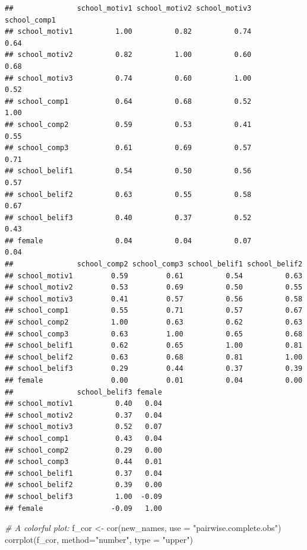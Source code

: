 \documentclass[
]{article}
\newenvironment{Shaded}{\begin{snugshade}}{\end{snugshade}}
\newcommand{\AttributeTok}[1]{\textcolor[rgb]{0.77,0.63,0.00}{#1}}
\newcommand{\CommentTok}[1]{\textcolor[rgb]{0.56,0.35,0.01}{\textit{#1}}}
\newcommand{\FunctionTok}[1]{\textcolor[rgb]{0.00,0.00,0.00}{#1}}
\newcommand{\NormalTok}[1]{#1}
\newcommand{\OtherTok}[1]{\textcolor[rgb]{0.56,0.35,0.01}{#1}}
\newcommand{\StringTok}[1]{\textcolor[rgb]{0.31,0.60,0.02}{#1}}
\begin{document}
\begin{verbatim}
##               school_motiv1 school_motiv2 school_motiv3 school_comp1
## school_motiv1          1.00          0.82          0.74         0.64
## school_motiv2          0.82          1.00          0.60         0.68
## school_motiv3          0.74          0.60          1.00         0.52
## school_comp1           0.64          0.68          0.52         1.00
## school_comp2           0.59          0.53          0.41         0.55
## school_comp3           0.61          0.69          0.57         0.71
## school_belif1          0.54          0.50          0.56         0.57
## school_belif2          0.63          0.55          0.58         0.67
## school_belif3          0.40          0.37          0.52         0.43
## female                 0.04          0.04          0.07         0.04
##               school_comp2 school_comp3 school_belif1 school_belif2
## school_motiv1         0.59         0.61          0.54          0.63
## school_motiv2         0.53         0.69          0.50          0.55
## school_motiv3         0.41         0.57          0.56          0.58
## school_comp1          0.55         0.71          0.57          0.67
## school_comp2          1.00         0.63          0.62          0.63
## school_comp3          0.63         1.00          0.65          0.68
## school_belif1         0.62         0.65          1.00          0.81
## school_belif2         0.63         0.68          0.81          1.00
## school_belif3         0.29         0.44          0.37          0.39
## female                0.00         0.01          0.04          0.00
##               school_belif3 female
## school_motiv1          0.40   0.04
## school_motiv2          0.37   0.04
## school_motiv3          0.52   0.07
## school_comp1           0.43   0.04
## school_comp2           0.29   0.00
## school_comp3           0.44   0.01
## school_belif1          0.37   0.04
## school_belif2          0.39   0.00
## school_belif3          1.00  -0.09
## female                -0.09   1.00
\end{verbatim}

\begin{Shaded}
\begin{Highlighting}[]
\CommentTok{\# A colorful plot:}
\NormalTok{f\_cor }\OtherTok{\textless{}{-}} \FunctionTok{cor}\NormalTok{(new\_names, }\AttributeTok{use =} \StringTok{"pairwise.complete.obs"}\NormalTok{)}
\FunctionTok{corrplot}\NormalTok{(f\_cor,}
         \AttributeTok{method=}\StringTok{"number"}\NormalTok{,}
         \AttributeTok{type =} \StringTok{"upper"}\NormalTok{)}
\end{Highlighting}
\end{Shaded}
\end{document}
